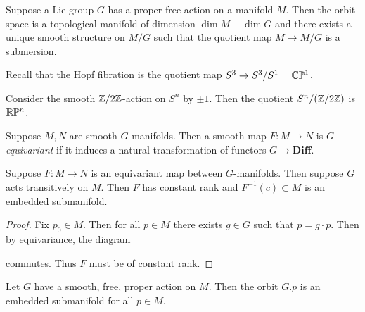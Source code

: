 \documentclass[twoside, 10pt]{article}
\begin{document}
    

    \begin{thm} Suppose a Lie group $G$ has a proper free action on a manifold
        $M$. Then the orbit space is a topological manifold of dimension $\dim
        M - \dim G$ and there exists a unique smooth structure on $M/G$ such
        that the quotient map $M \to M/G$ is a submersion.  \end{thm}

    \begin{exm} Recall that the Hopf fibration is the quotient map $S^3 \to
    S^3/S^1 = \mathbb{C}\mathbb{P}^1$.  \end{exm}

    \begin{exm} Consider the smooth $\mathbb{Z}/2\mathbb{Z}$-action on $S^n$ by $\pm 1$. Then
    the quotient $S^n/(\mathbb{Z}/2\mathbb{Z})$ is $\mathbb{R}\mathbb{P}^n$.  \end{exm}
    
    \begin{defn} Suppose $M, N$ are smooth $G$-manifolds. Then a smooth map
    $F:M \to N$ is \textit{$G$-equivariant} if it induces a natural
transformation of functors $G \to \mathbf{Diff}$.  \end{defn}    
    
    \begin{thm} Suppose $F:M \to N$ is an equivariant map between
    $G$-manifolds. Then suppose $G$ acts transitively on $M$. Then $F$ has
constant rank and $F^{-1}(c) \subset M$ is an embedded submanifold.  \end{thm}

    \begin{proof} Fix $p_0 \in M$. Then for all $p \in M$ there exists $g \in
        G$ such that $p = g \cdot p$. Then by equivariance, the diagram
        \begin{center}  \end{center} commutes. Thus $F$ must be of constant rank.
        \end{proof}

    \begin{cor} Let $G$ have a smooth, free, proper action on $M$. Then the
    orbit $G.p$ is an embedded submanifold for all $p \in M$.  \end{cor}
\end{document}

